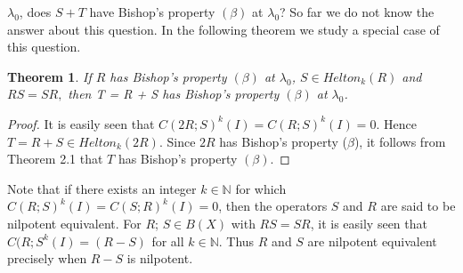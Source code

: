 \documentclass[12pt,a4paper]{amsart}
\newtheorem{theorem}{Theorem}[section]
\begin{document}
$\lambda_{0}$, does $S + T$ have Bishop's property $(\beta)$ at
$\lambda_{0}$? So far we do not know the answer about this
question. In the following theorem we study a special case of this
question.
\begin{theorem} If $R$ has Bishop's property $(\beta)$ at $\lambda_{0}$, $S \in
Helton_{k}(R)$ and $RS = SR,$ then T = R + S has Bishop's property
$(\beta)$ at $\lambda_{0}$.
\end{theorem}
\begin{proof}
It is easily seen that $C(2R; S)^{k}(I) = C(R; S)^{k}(I) = 0$.
Hence $T = R + S \in  Helton_{k}(2R)$. Since $2R$ has Bishop's
property ($\beta$), it follows from Theorem 2.1 that $T$ has
Bishop's property $(\beta)$.
\end{proof}

Note that if there exists an integer $k\in \mathbb{N}$ for which
$C(R; S)^{k}(I) = C(S;R)^{k}(I) = 0$, then the operators $S$ and
$R$ are said to be nilpotent equivalent. For $R$; $S\in B(X)$ with
$RS = SR$, it is easily seen that $C(R; S^{k}(I) = (R- S)^{}$ for
all $k \in \mathbb{N}$. Thus $R$ and $S$ are nilpotent equivalent
precisely when $R - S$ is nilpotent.
\end{document}
